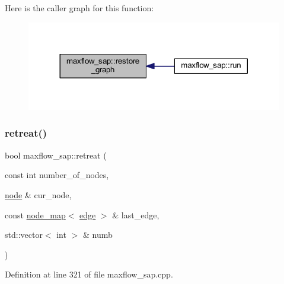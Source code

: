 Here is the caller graph for this function\+:\nopagebreak
\begin{figure}[H]
\begin{center}
\leavevmode
\includegraphics[width=317pt]{classmaxflow__sap_ad1a311df47e4b9936ead7c306d723ed0_icgraph}
\end{center}
\end{figure}
\mbox{\label{classmaxflow__sap_a88a24204f44031d2332493474ee18f95}} 
\subsubsection{\texorpdfstring{retreat()}{retreat()}}
{\footnotesize\ttfamily bool maxflow\+\_\+sap\+::retreat (\begin{DoxyParamCaption}\item[{const int}]{number\+\_\+of\+\_\+nodes,  }\item[{\mbox{\hyperlink{classnode}{node}} \&}]{cur\+\_\+node,  }\item[{const \mbox{\hyperlink{classnode__map}{node\+\_\+map}}$<$ \mbox{\hyperlink{classedge}{edge}} $>$ \&}]{last\+\_\+edge,  }\item[{std\+::vector$<$ int $>$ \&}]{numb }\end{DoxyParamCaption})\hspace{0.3cm}{\ttfamily [protected]}}



Definition at line 321 of file maxflow\+\_\+sap.\+cpp.


